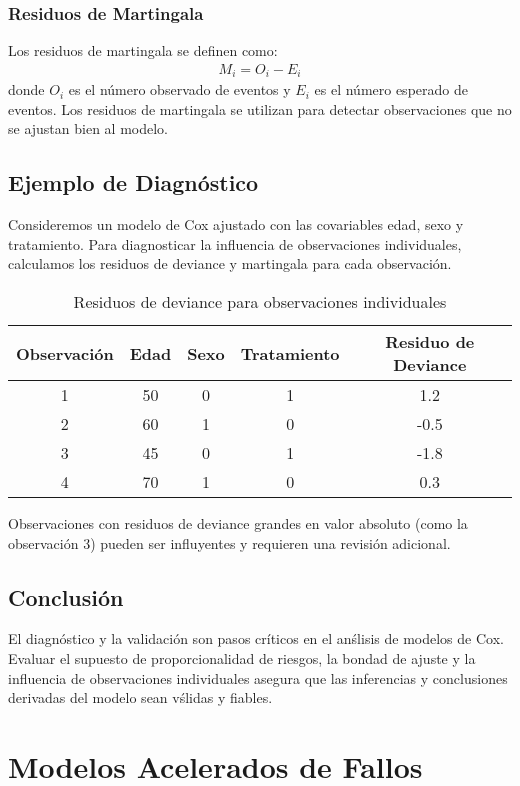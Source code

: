 \documentclass[a4paper]{report} %
\begin{document}
\subsection{Residuos de Martingala}
Los residuos de martingala se definen como:
\begin{eqnarray*}
M_i = O_i - E_i
\end{eqnarray*}
donde $O_i$ es el n\'umero observado de eventos y $E_i$ es el n\'umero esperado de eventos. Los residuos de martingala se utilizan para detectar observaciones que no se ajustan bien al modelo.

\section{Ejemplo de Diagn\'ostico}
Consideremos un modelo de Cox ajustado con las covariables edad, sexo y tratamiento. Para diagnosticar la influencia de observaciones individuales, calculamos los residuos de deviance y martingala para cada observaci\'on.

\begin{table}[h]
\centering
\begin{tabular}{|c|c|c|c|c|}
\hline
Observaci\'on & Edad & Sexo & Tratamiento & Residuo de Deviance \\
\hline
1 & 50 & 0 & 1 & 1.2 \\
2 & 60 & 1 & 0 & -0.5 \\
3 & 45 & 0 & 1 & -1.8 \\
4 & 70 & 1 & 0 & 0.3 \\
\hline
\end{tabular}
\caption{Residuos de deviance para observaciones individuales}
\end{table}

Observaciones con residuos de deviance grandes en valor absoluto (como la observaci\'on 3) pueden ser influyentes y requieren una revisi\'on adicional.

\section{Conclusi\'on}
El diagn\'ostico y la validaci\'on son pasos cr\'iticos en el an\'slisis de modelos de Cox. Evaluar el supuesto de proporcionalidad de riesgos, la bondad de ajuste y la influencia de observaciones individuales asegura que las inferencias y conclusiones derivadas del modelo sean v\'slidas y fiables.



\chapter{Modelos Acelerados de Fallos}
\end{document}

